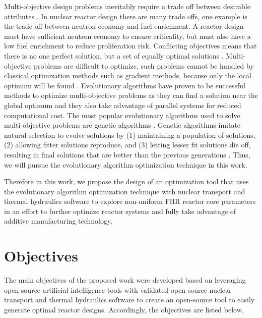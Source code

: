 Multi-objective design problems inevitably require a trade off between 
desirable attributes \cite{byrne_evolving_2014,simon_sciences_2019}. 
In nuclear reactor design there are many trade offs, one example is the 
trade-off between neutron economy and fuel enrichment. 
A reactor design must have sufficient neutron economy to ensure criticality, 
but must also have a low fuel enrichment to reduce proliferation risk.
Conflicting objectives means that there is no one perfect solution, but a set
of equally optimal solutions \cite{byrne_evolving_2014}.
Multi-objective problems are difficult to optimize, such problems 
cannot be handled by classical optimization methods such as gradient 
methods, because only the local optimum will be found \cite{renner_genetic_2003}. 
Evolutionary algorithms have proven to be successful 
methods to optimize multi-objective problems \cite{krish_practical_2011} as 
they can find a solution near the global optimum \cite{renner_genetic_2003}
and they also take advantage of parallel systems for reduced computational 
cost. 
The most popular evolutionary algorithms used to solve multi-objective 
problems are genetic algorithms 
\cite{byrne_evolving_2014, krish_practical_2011}. 
Genetic algorithms imitate natural selection to evolve solutions 
by (1) maintaining a population of solutions, (2) allowing 
fitter solutions reproduce, and (3) letting lesser fit solutions die off, 
resulting in final solutions that are better than the previous generations 
\cite{renner_genetic_2003}. 
Thus, we will pursue the evolutionary algorithm optimization technique 
in this work. 

Therefore in this work, we propose the design of an optimization tool that uses 
the evolutionary algorithm optimization technique with nuclear transport and 
thermal hydraulics software to explore non-uniform \gls{FHR} reactor core parameters 
in an effort to further optimize reactor systems and fully take advantage of 
additive manufacturing technology.  


\section{Objectives}
The main objectives of the proposed work were developed based on leveraging open-source 
artificial intelligence tools with validated open-source nuclear transport and 
thermal hydraulics software to create an open-source tool to easily generate 
optimal reactor designs. 
Accordingly, the objectives are listed below. 
\vspace{0.2cm} 

